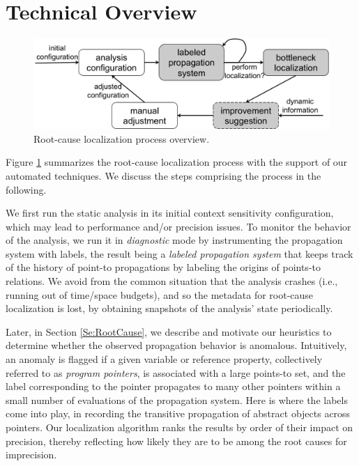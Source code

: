 \section{Technical Overview}
\label{design}

\begin{figure}[th!]
        \includegraphics[width=\columnwidth]{overview}
\caption{\textmd{Root-cause localization process overview.}}
\label{fig:overview}
\end{figure}


Figure \ref{fig:overview} summarizes the root-cause localization process with the support of our automated techniques. We discuss the steps comprising the process in the following.

We first run the static analysis in its initial context sensitivity configuration, which may lead to performance and/or precision issues. To monitor the behavior of the analysis, we run it in \emph{diagnostic} mode by instrumenting the propagation system with labels, the result being a \emph{labeled propagation system} that keeps track of the history of point-to propagations by labeling the origins of points-to relations. We avoid from the common situation that the analysis crashes (i.e., running out of time/space budgets), and so the metadata for root-cause localization is lost, by obtaining snapshots of the analysis' state periodically.

Later, in Section \ref{Se:RootCause}, we describe and motivate our heuristics to determine whether the observed propagation behavior is anomalous. Intuitively, an anomaly is flagged if a given variable or reference property, collectively referred to as \emph{program pointers}, is associated with a large points-to set, and the label corresponding to the pointer propagates to many other pointers within a small number of evaluations of the propagation system. Here is where the labels come into play, in recording the transitive propagation of abstract objects across pointers. Our localization algorithm ranks the results by order of their impact on precision, thereby reflecting how likely they are to be among the root causes for imprecision.

